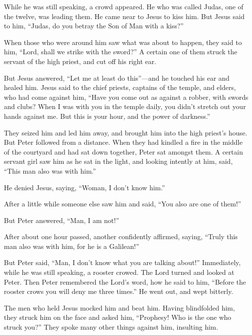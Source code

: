  While he was still speaking, a crowd appeared. He who
was called Judas, one of the twelve, was leading them. He came near to
Jesus to kiss him.  But Jesus said to him, ``Judas, do
you betray the Son of Man with a kiss?''

 When those who were around him saw what was about to
happen, they said to him, ``Lord, shall we strike with the sword?''
 A certain one of them struck the servant of the high
priest, and cut off his right ear.

 But Jesus answered, ``Let me at least do this''---and he
touched his ear and healed him.  Jesus said to the chief
priests, captains of the temple, and elders, who had come against him,
``Have you come out as against a robber, with swords and clubs?
 When I was with you in the temple daily, you didn't
stretch out your hands against me. But this is your hour, and the power
of darkness.''

 They seized him and led him away, and brought him into
the high priest's house. But Peter followed from a distance.
 When they had kindled a fire in the middle of the
courtyard and had sat down together, Peter sat amongst them.
 A certain servant girl saw him as he sat in the light,
and looking intently at him, said, ``This man also was with him.''

 He denied Jesus, saying, ``Woman, I don't know him.''

 After a little while someone else saw him and said,
``You also are one of them!''

But Peter answered, ``Man, I am not!''

 After about one hour passed, another confidently
affirmed, saying, ``Truly this man also was with him, for he is a
Galilean!''

 But Peter said, ``Man, I don't know what you are talking
about!'' Immediately, while he was still speaking, a rooster crowed.
 The Lord turned and looked at Peter. Then Peter
remembered the Lord's word, how he said to him, ``Before the rooster
crows you will deny me three times.''  He went out, and
wept bitterly.

 The men who held Jesus mocked him and beat him.
 Having blindfolded him, they struck him on the face and
asked him, ``Prophesy! Who is the one who struck you?'' 
They spoke many other things against him, insulting him.

